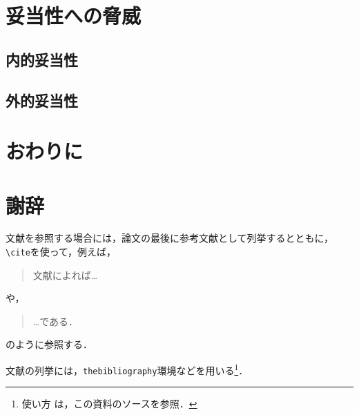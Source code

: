 \documentclass[11pt,dvipdfmx]{jreport}
\begin{document}
\chapter{妥当性への脅威}

\section{内的妥当性}

\section{外的妥当性}

\chapter{おわりに}

\chapter*{謝辞}

文献を参照する場合には，論文の最後に参考文献として列挙するとともに，
\verb|\cite|を使って，例えば，
\begin{quote}
  文献\cite{1390850475731067264}によれば…
\end{quote}
や，
\begin{quote}
  …である\cite{latex2e}．
\end{quote}
のように参照する．

文献の列挙には，{\tt thebibliography}環境などを用いる\footnote{使い方
は，この資料のソースを参照．}．









% 
% 
% 

\end{document}
